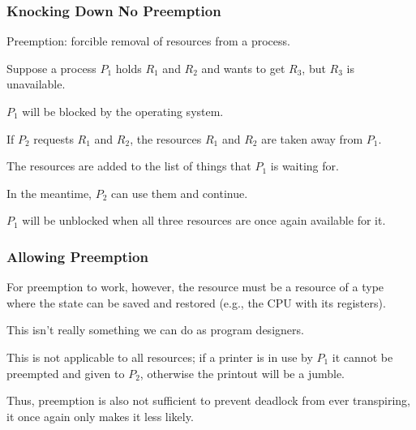 \begin{frame}
	\frametitle{Knocking Down No Preemption}

	Preemption: forcible removal of resources from a process.

	Suppose a process $P_{1}$ holds $R_{1}$ and $R_{2}$ and wants to get $R_{3}$, but $R_{3}$ is unavailable.

	$P_{1}$ will be blocked by the operating system.

	If $P_{2}$ requests $R_{1}$ and $R_{2}$, the resources $R_{1}$ and $R_{2}$ are taken away from $P_{1}$.

	The resources are added to the list of things that $P_{1}$ is waiting for.

	In the meantime, $P_{2}$ can use them and continue.

	$P_{1}$ will be unblocked when all three resources are once again available for it.

\end{frame}


\begin{frame}
	\frametitle{Allowing Preemption}

	For preemption to work, however, the resource must be a resource of a type where the state can be saved and restored (e.g., the CPU with its registers).

	This isn't really something we can do as program designers.

	This is not applicable to all resources; if a printer is in use by $P_{1}$ it cannot be preempted and given to $P_{2}$, otherwise the printout will be a jumble.

	Thus, preemption is also not sufficient to prevent deadlock from ever transpiring, it once again only makes it less likely.



\end{frame}




